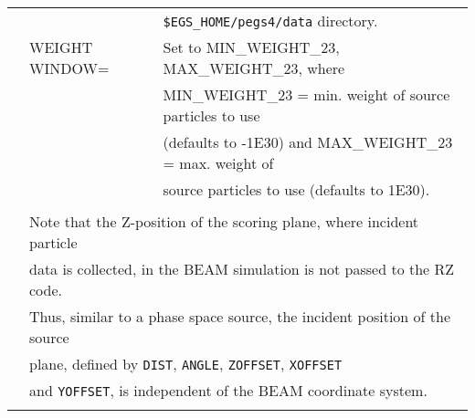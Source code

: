 \begin{longtable}{lll}
  &            & {\tt \$EGS\_HOME/pegs4/data} directory.\\
  & WEIGHT WINDOW= & Set to MIN\_WEIGHT\_23, MAX\_WEIGHT\_23, where\\
  &            & MIN\_WEIGHT\_23 = min. weight of source particles to use\\
  &            & (defaults to -1E30) and MAX\_WEIGHT\_23 = max. weight of\\
  &            & source particles to use (defaults to 1E30).\\
  &&\\
  & \multicolumn{2}{l}{Note that the Z-position of the scoring plane, where incident particle}\\
  & \multicolumn{2}{l}{data is collected, in the BEAM simulation is not passed to the RZ code.}\\
  & \multicolumn{2}{l}{Thus, similar to a phase space source, the incident position of the source}\\
  & \multicolumn{2}{l}{plane, defined by {\tt DIST}, {\tt ANGLE}, {\tt ZOFFSET}, {\tt XOFFSET}}\\
  & \multicolumn{2}{l}{and {\tt YOFFSET}, is independent of the BEAM coordinate system.}\\
\hline
\label{tab:srcrz}
\end{longtable}
